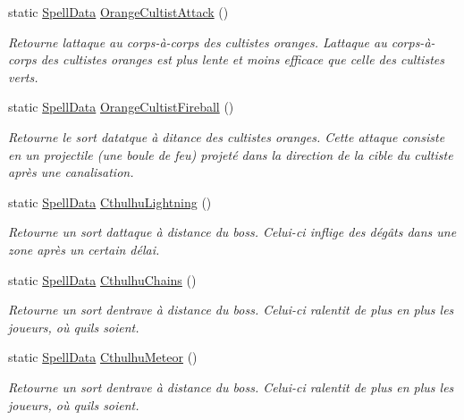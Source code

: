 \begin{DoxyCompactItemize}
static \hyperlink{class_tentacle_slicers_1_1spells_1_1_spell_data}{Spell\+Data} \hyperlink{class_tentacle_slicers_1_1customs_1_1_spells_a2fd11f64a567bf4b829fafe59fdb2777}{Orange\+Cultist\+Attack} ()
\begin{DoxyCompactList}\small\item\em Retourne l\textquotesingle{}attaque au corps-\/à-\/corps des cultistes oranges. L\textquotesingle{}attaque au corps-\/à-\/corps des cultistes oranges est plus lente et moins efficace que celle des cultistes verts. \end{DoxyCompactList}\item 
static \hyperlink{class_tentacle_slicers_1_1spells_1_1_spell_data}{Spell\+Data} \hyperlink{class_tentacle_slicers_1_1customs_1_1_spells_a423a02f284ad48266b68b8952a5f9f6a}{Orange\+Cultist\+Fireball} ()
\begin{DoxyCompactList}\small\item\em Retourne le sort d\textquotesingle{}atatque à ditance des cultistes oranges. Cette attaque consiste en un projectile (une boule de feu) projeté dans la direction de la cible du cultiste après une canalisation. \end{DoxyCompactList}\item 
static \hyperlink{class_tentacle_slicers_1_1spells_1_1_spell_data}{Spell\+Data} \hyperlink{class_tentacle_slicers_1_1customs_1_1_spells_ac53a8734a12767f86c977c48f7ac7c7f}{Cthulhu\+Lightning} ()
\begin{DoxyCompactList}\small\item\em Retourne un sort d\textquotesingle{}attaque à distance du boss. Celui-\/ci inflige des dégâts dans une zone après un certain délai. \end{DoxyCompactList}\item 
static \hyperlink{class_tentacle_slicers_1_1spells_1_1_spell_data}{Spell\+Data} \hyperlink{class_tentacle_slicers_1_1customs_1_1_spells_aa4f86ba1ed765465f478d1bad8021f92}{Cthulhu\+Chains} ()
\begin{DoxyCompactList}\small\item\em Retourne un sort d\textquotesingle{}entrave à distance du boss. Celui-\/ci ralentit de plus en plus les joueurs, où qu\textquotesingle{}ils soient. \end{DoxyCompactList}\item 
static \hyperlink{class_tentacle_slicers_1_1spells_1_1_spell_data}{Spell\+Data} \hyperlink{class_tentacle_slicers_1_1customs_1_1_spells_aa7ab3b9198afe02928388f6e7a894508}{Cthulhu\+Meteor} ()
\begin{DoxyCompactList}\small\item\em Retourne un sort d\textquotesingle{}entrave à distance du boss. Celui-\/ci ralentit de plus en plus les joueurs, où qu\textquotesingle{}ils soient. \end{DoxyCompactList}\item 

\end{DoxyCompactItemize}
